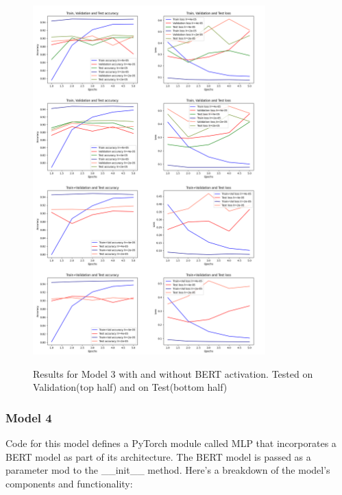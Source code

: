 \begin{center}
    \begin{figure}[!h]
        \centering
        \includegraphics[width=0.8\textwidth]{images/ger_model2_vertical.png}
        \label{fig:ger_model2}
        \caption{Results for Model 3 with and without BERT activation. Tested on Validation(top half) and on Test(bottom half)}
    \end{figure}
\end{center}


\subsubsection{Model 4}

Code for this model defines a PyTorch module called MLP that incorporates a BERT model as part of its architecture. The BERT model is passed as a parameter mod to the \_\_init\_\_ method. Here's a breakdown of the model's components and functionality:

